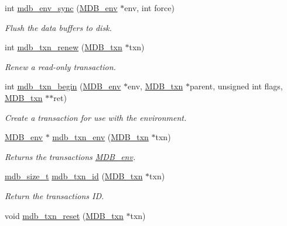 \begin{DoxyCompactItemize}
\item 
int \mbox{\hyperlink{group__internal_ga85e61f05aa68b520cc6c3b981dba5037}{mdb\+\_\+env\+\_\+sync}} (\mbox{\hyperlink{struct_m_d_b__env}{M\+D\+B\+\_\+env}} $\ast$env, int force)
\begin{DoxyCompactList}\small\item\em Flush the data buffers to disk. \end{DoxyCompactList}\item 
int \mbox{\hyperlink{group__internal_ga6c6f917959517ede1c504cf7c720ce6d}{mdb\+\_\+txn\+\_\+renew}} (\mbox{\hyperlink{struct_m_d_b__txn}{M\+D\+B\+\_\+txn}} $\ast$txn)
\begin{DoxyCompactList}\small\item\em Renew a read-\/only transaction. \end{DoxyCompactList}\item 
int \mbox{\hyperlink{group__internal_gaec09fc4062fc4d99882f7f7256570bdb}{mdb\+\_\+txn\+\_\+begin}} (\mbox{\hyperlink{struct_m_d_b__env}{M\+D\+B\+\_\+env}} $\ast$env, \mbox{\hyperlink{struct_m_d_b__txn}{M\+D\+B\+\_\+txn}} $\ast$parent, unsigned int flags, \mbox{\hyperlink{struct_m_d_b__txn}{M\+D\+B\+\_\+txn}} $\ast$$\ast$ret)
\begin{DoxyCompactList}\small\item\em Create a transaction for use with the environment. \end{DoxyCompactList}\item 
\mbox{\hyperlink{struct_m_d_b__env}{M\+D\+B\+\_\+env}} $\ast$ \mbox{\hyperlink{group__internal_gaeb17735b8aaa2938a78a45cab85c06a0}{mdb\+\_\+txn\+\_\+env}} (\mbox{\hyperlink{struct_m_d_b__txn}{M\+D\+B\+\_\+txn}} $\ast$txn)
\begin{DoxyCompactList}\small\item\em Returns the transaction\textquotesingle{}s \mbox{\hyperlink{struct_m_d_b__env}{M\+D\+B\+\_\+env}}. \end{DoxyCompactList}\item 
\mbox{\hyperlink{lmdb_8h_a78821971e612e3898ef4b3ae45ed86f1}{mdb\+\_\+size\+\_\+t}} \mbox{\hyperlink{group__internal_ga7b057cd5215b52b5bfa85d30699d3c8d}{mdb\+\_\+txn\+\_\+id}} (\mbox{\hyperlink{struct_m_d_b__txn}{M\+D\+B\+\_\+txn}} $\ast$txn)
\begin{DoxyCompactList}\small\item\em Return the transaction\textquotesingle{}s ID. \end{DoxyCompactList}\item 
void \mbox{\hyperlink{group__internal_ga02b06706f8a66249769503c4e88c56cd}{mdb\+\_\+txn\+\_\+reset}} (\mbox{\hyperlink{struct_m_d_b__txn}{M\+D\+B\+\_\+txn}} $\ast$txn)
$$
\end{DoxyCompactItemize}
